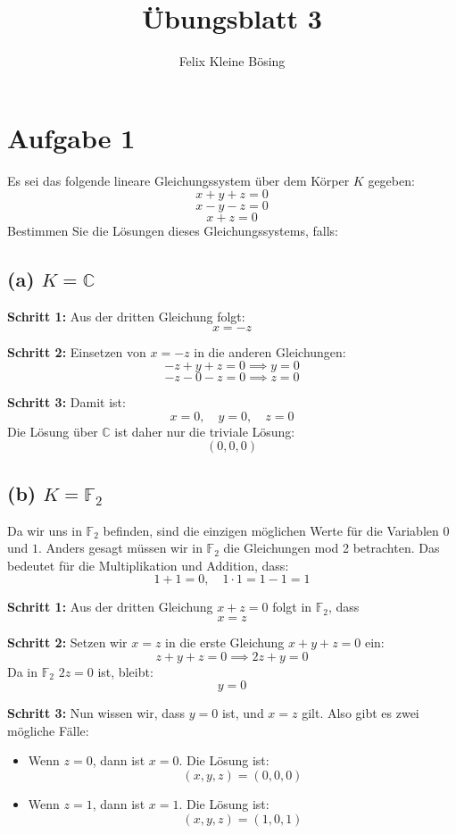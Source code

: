 \documentclass[11pt]{article}
\begin{document}
\title{Übungsblatt 3}
\author{Felix Kleine Bösing}
\maketitle

\section*{Aufgabe 1}


Es sei das folgende lineare Gleichungssystem über dem Körper \( K \) gegeben:
\[
x + y + z = 0
\]
\[
x - y - z = 0
\]
\[
x + z = 0
\]
Bestimmen Sie die Lösungen dieses Gleichungssystems, falls:

\subsection*{(a) \( K = \mathbb{C} \)}

\textbf{Schritt 1:} Aus der dritten Gleichung folgt:
\[
x = -z
\]

\textbf{Schritt 2:} Einsetzen von \( x = -z \) in die anderen Gleichungen:
\[
-z + y + z = 0 \implies y = 0
\]
\[
-z - 0 - z = 0 \implies z = 0
\]

\textbf{Schritt 3:} Damit ist:
\[
x = 0, \quad y = 0, \quad z = 0
\]
Die Lösung über \( \mathbb{C} \) ist daher nur die triviale Lösung:
\[
(0, 0, 0)
\]

\subsection*{(b) \( K = \mathbb{F}_2 \)}

Da wir uns in \( \mathbb{F}_2 \) befinden, sind die einzigen möglichen Werte für die Variablen \( 0 \) und \( 1 \).
Anders gesagt müssen wir in \( \mathbb{F}_2 \) die Gleichungen mod 2 betrachten. Das bedeutet für die Multiplikation und Addition, dass:
\[
    1 + 1 = 0, \quad 1 \cdot 1 = 1
    -1 = 1
\]

\textbf{Schritt 1:} Aus der dritten Gleichung \( x + z = 0 \) folgt in \( \mathbb{F}_2 \), dass
\[
x = z
\]

\textbf{Schritt 2:} Setzen wir \( x = z \) in die erste Gleichung \( x + y + z = 0 \) ein:
\[
z + y + z = 0 \implies 2z + y = 0
\]
Da in \( \mathbb{F}_2 \) \( 2z = 0 \) ist, bleibt:
\[
y = 0
\]

\textbf{Schritt 3:} Nun wissen wir, dass \( y = 0 \) ist, und \( x = z \) gilt. Also gibt es zwei mögliche Fälle:
\begin{itemize}
    \item Wenn \( z = 0 \), dann ist \( x = 0 \). Die Lösung ist:
    \[
    (x, y, z) = (0, 0, 0)
    \]
    \item Wenn \( z = 1 \), dann ist \( x = 1 \). Die Lösung ist:
    \[
    (x, y, z) = (1, 0, 1)
    \]
\end{itemize}
\end{document}
